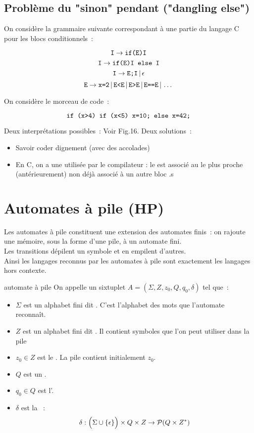 \begin{adjustwidth}{-3cm}{-3cm}
\subsection{Problème du "sinon" pendant ("dangling else")}

On considère la grammaire suivante correspondant à une partie du langage C pour les blocs conditionnels~:

$$\texttt{I}\to\texttt{if(E)I}$$
$$\texttt{I}\to\texttt{if(E)I else I}$$
$$\texttt{I}\to\texttt{E;I}\,\vert\, \epsilon$$
$$\texttt{E}\to\texttt{x=2} \,\vert\, \texttt{E<E} \,\vert\, \texttt{E>E} \,\vert\, \texttt{E==E} \,\vert\, \dots$$

On considère le morceau de code~:

$$\texttt{if (x>4) if (x<5) x=10; else x=42;}$$

Deux interprétations possibles~: Voir Fig.16.
Deux solutions~:
\begin{itemize}
    \item Savoir coder dignement (avec des accolades)
    \item En C, on a une  utilisée par le compilateur : le  est associé au  le plus proche (antérieurement) non déjà associé à un autre bloc .s
\end{itemize}

\section{Automates à pile (HP)}

Les automates à pile constituent une extension des automates finis~: on rajoute une mémoire, sous la forme d'une pile, à un automate fini.\\
Les transitions dépilent un symbole et en empilent d'autres.\\
Ainsi les langages reconnus par les automates à pile sont exactement les langages hors contexte.

\begin{definition}{}{automate à pile}
    On appelle  un sixtuplet $A = (\Sigma, Z, z_0, Q, q_0, \delta)$ tel que~:
    \begin{itemize}
        \item $\Sigma$ est un alphabet fini dit . C'est l'alphabet des mots que l'automate reconnaît.
        \item $Z$ est un alphabet fini dit . Il contient symboles que l'on peut utiliser dans la pile
        \item $z_0 \in Z$ est le . La pile contient initialement $z_0$.
        \item $Q$ est un .
        \item $q_0 \in Q$ est l'.
        \item $\delta$ est la ~:
        $$\delta : \Big(\Sigma \cup \{\epsilon\}\Big)\times Q\times Z \to \mathcal{P}(Q\times Z^*)$$
    \end{itemize}
\end{definition}


\end{adjustwidth}
